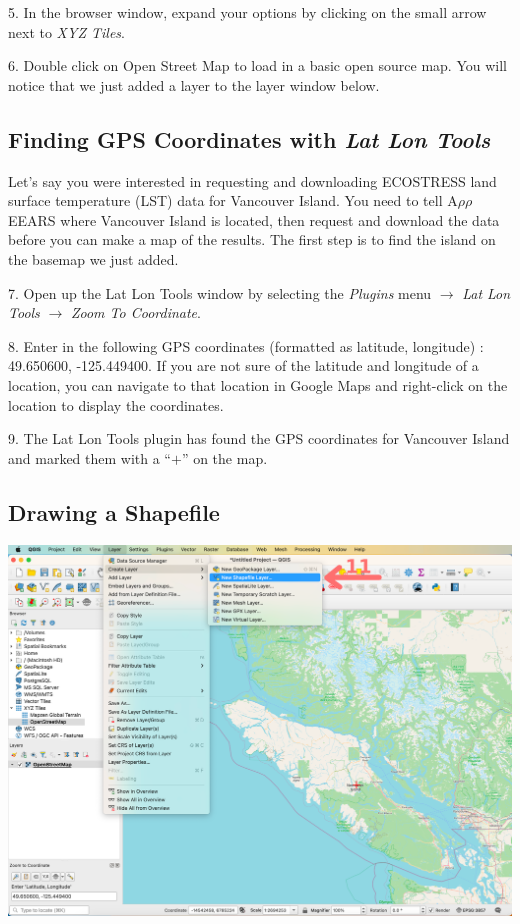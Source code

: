 \documentclass[oneside,a4paper,11pt,explicit]{book}
\begin{document}
	5. In the browser window, expand your options by clicking on the small arrow next to \textit{XYZ Tiles}.
	
	6. Double click on Open Street Map to load in a basic open source map. You will notice that we just added a layer to the layer window below.
	
	\subsection{Finding GPS Coordinates with \textit{Lat Lon Tools}}
	
	Let's say you were interested in requesting and downloading ECOSTRESS land surface temperature (LST) data for Vancouver Island. You need to tell A$\rho\rho$EEARS where Vancouver Island is located, then request and download the data before you can make a map of the results. The first step is to find the island on the basemap we just added.
	
	7. Open up the Lat Lon Tools window by selecting the \textit{Plugins} menu $\rightarrow$ \textit{Lat Lon Tools} $\rightarrow$ \textit{Zoom To Coordinate}.
	
	8. Enter in the following GPS coordinates (formatted as latitude, longitude) : 49.650600, -125.449400. If you are not sure of the latitude and longitude of a location, you can navigate to that location in Google Maps and right-click on the location to display the coordinates. 
	
	9. The Lat Lon Tools plugin has found the GPS coordinates for Vancouver Island and marked them with a ``$+$'' on the map. 
	
	\subsection{Drawing a Shapefile}
	
	\centerline{\includegraphics[width=.9\textwidth]{CreateLayer.png}}
	
\end{document}
